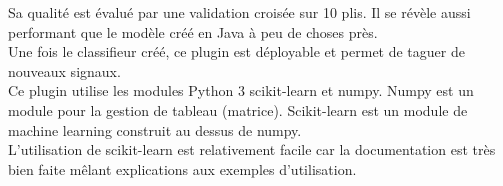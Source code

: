         Sa qualité est évalué par une validation croisée sur 10 plis. Il se révèle aussi performant que le modèle créé en Java à peu de choses près.\\

        Une fois le classifieur créé, ce plugin est déployable et permet de taguer de nouveaux signaux.\\

        Ce plugin utilise les modules Python 3 scikit-learn et numpy. Numpy est un module pour la gestion de tableau (matrice). Scikit-learn est un module de machine learning construit au dessus de numpy.\\
        L'utilisation de scikit-learn est relativement facile car la documentation est très bien faite mêlant explications aux exemples d'utilisation.